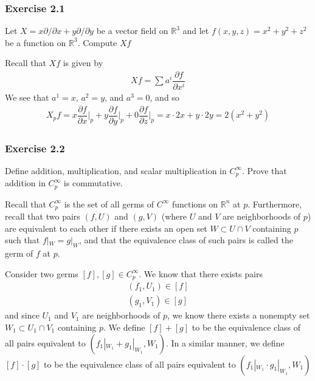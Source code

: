 \documentclass{article}
\newcommand{\R}{\mathbb{R}}
\newcommand{\Cinfty}{C^{\infty}}
\begin{document}
	
	\subsubsection*{Exercise 2.1}
	Let $X = x \partial / \partial x + y \partial / \partial y$ be a vector field on $\R^3$ and let $f(x, y, z) = x^2 + y^2 + z^2$ be a function on $\R^3$. Compute $Xf$
	
	Recall that $Xf$ is given by
	\begin{gather*}
		Xf = \sum a^i \dfrac{\partial f}{\partial x^i}
	\end{gather*}
	We see that $a^1 = x$, $a^2 = y$, and $a^3 = 0$, and so
	\begin{gather*}
		X_p f = x \dfrac{\partial f}{\partial x} \Bigg|_p + y \dfrac{\partial f}{\partial y} \Bigg|_p + 0 \dfrac{\partial f}{\partial z} \Bigg|_p 
		= x \cdot 2 x + y \cdot 2 y = 2 \left( x^2 + y^2 \right)
	\end{gather*}
	
	\subsubsection*{Exercise 2.2}
	Define addition, multiplication, and scalar multiplication in $\Cinfty_p$. Prove that addition in $\Cinfty_p$ is commutative.
	
	Recall that $\Cinfty_p$ is the set of all germs of $\Cinfty$ functions on $\R^n$ at $p$. Furthermore, recall that two pairs $(f, U)$ and $(g, V)$ (where $U$ and $V$ are neighborhoods of $p$) are equivalent to each other if there exists an open set $W \subset U \cap V$ containing $p$ such that $f|_W = g|_W$, and that the equivalence class of such pairs is called the germ of $f$ at $p$.
	
	Consider two germs $[f], [g] \in \Cinfty_p$. We know that there exists pairs
	\begin{gather*}
		(f_1, U_1) \in [f] \\
		(g_1, V_1) \in [g]
	\end{gather*}
	and since $U_1$ and $V_1$ are neighborhoods of $p$, we know there exists a nonempty set $W_1 \subset U_1 \cap V_1$ containing $p$. We define $[f] + [g]$ to be the equivalence class of all pairs equivalent to $(f_1|_{W_1} + g_1|_{W_1}, W_1)$. In a similar manner, we define $[f] \cdot [g]$ to be the equivalence class of all pairs equivalent to  $(f_1|_{W_1} \cdot g_1|_{W_1}, W_1)$
	
\end{document}
